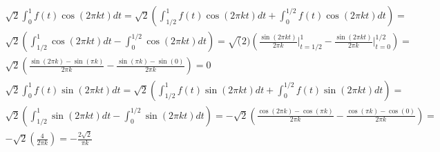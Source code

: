 \documentclass[11pt,a4paper]{scrartcl}
\begin{document}
\subsection{} %
\subsubsection{} %
\begin{align}
\sqrt{2}\int_{0}^{1} f(t) \cos(2 \pi kt)dt = \sqrt{2} (\int_{1/2}^{1} f(t) \cos(2 \pi kt)dt + \int_{0}^{1/2} f(t) \cos(2 \pi kt)dt) =\\
\sqrt{2} (\int_{1/2}^{1}\cos(2 \pi kt)dt - \int_{0}^{1/2}\cos(2 \pi kt)dt) = \sqrt(2)(\frac{\sin(2\pi kt)}{2\pi k}\rvert_{t=1/2}^{1} - \frac{\sin(2\pi kt)}{2\pi k}\rvert_{t=0}^{1/2}) =\\
\sqrt{2}(\frac{\sin(2\pi k) - \sin(\pi k)}{2\pi k} - \frac{\sin(\pi k) - \sin(0)}{2\pi k}) = 0\\
\sqrt{2}\int_{0}^{1} f(t) \sin(2 \pi kt)dt = \sqrt{2} (\int_{1/2}^{1} f(t) \sin(2 \pi kt)dt + \int_{0}^{1/2} f(t) \sin(2 \pi kt)dt) =\\
\sqrt{2} (\int_{1/2}^{1}\sin(2 \pi kt)dt - \int_{0}^{1/2}\sin(2 \pi kt)dt) = -\sqrt{2}(\frac{\cos(2\pi k) - \cos(\pi k)}{2\pi k} - \frac{\cos(\pi k) - \cos(0)}{2\pi k}) =\\
-\sqrt{2}(\frac{4}{2\pi k}) = -\frac{2\sqrt{2}}{\pi k}
\end{align}
\end{document}
